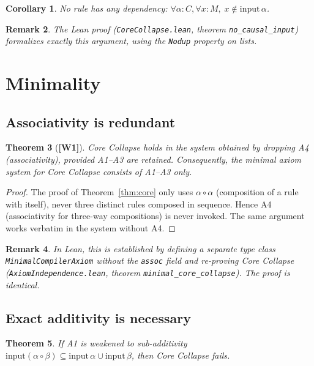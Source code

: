 ﻿\documentclass[11pt]{article}
\newcommand{\wone}[1]{\textcolor{wcolor}{\textbf{[#1]}}}
\newtheorem{theorem}{Theorem}
\newtheorem{corollary}[theorem]{Corollary}
\newtheorem{remark}[theorem]{Remark}
\begin{document}
\begin{corollary}
\label{cor:no-dependency}
No rule has any dependency:
$\forall \alpha : C, \forall x : M,\; x \notin \mathrm{input}\,\alpha$.
\end{corollary}

\begin{remark}
The Lean proof (\texttt{CoreCollapse.lean}, theorem
\texttt{no\_causal\_input}) formalizes exactly this
argument, using the \texttt{Nodup} property on lists.
\end{remark}

\section{Minimality}
\label{sec:minimal}

\subsection{Associativity is redundant}

\begin{theorem}[\wone{W1}]
\label{thm:assoc-redundant}
Core Collapse holds in the system obtained by dropping A4
(associativity), provided A1--A3 are retained. Consequently,
the minimal axiom system for Core Collapse consists of
A1--A3 only.
\end{theorem}

\begin{proof}
The proof of Theorem~\ref{thm:core} only uses
$\alpha \circ \alpha$ (composition of a rule with itself),
never three distinct rules composed in sequence. Hence
A4 (associativity for three-way compositions) is never
invoked. The same argument works verbatim in the system
without A4.
\end{proof}

\begin{remark}
In Lean, this is established by defining a separate type
class \texttt{MinimalCompilerAxiom} without the
\texttt{assoc} field and re-proving Core Collapse
(\texttt{AxiomIndependence.lean}, theorem
\texttt{minimal\_core\_collapse}). The proof is identical.
\end{remark}

\subsection{Exact additivity is necessary}

\begin{theorem}
\label{thm:subadd-fails}
If A1 is weakened to sub-additivity
$\mathrm{input}(\alpha \circ \beta) \subseteq
 \mathrm{input}\,\alpha \cup \mathrm{input}\,\beta$,
then Core Collapse fails.
\end{theorem}
\end{document}
